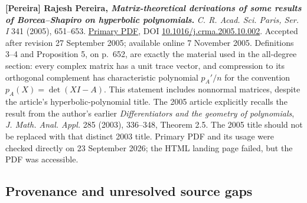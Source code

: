 \documentclass[
  british,
  10pt,
]{article}
\begin{document}
\textbf{{[}Pereira{]} Rajesh Pereira, \emph{Matrix-theoretical
derivations of some results of Borcea--Shapiro on hyperbolic
polynomials}.} \emph{C. R. Acad. Sci. Paris, Ser. I} 341 (2005),
651--653.
\href{https://www.numdam.org/item/CRMATH_2005__341_11_651_0.pdf}{Primary
PDF}, DOI
\href{https://doi.org/10.1016/j.crma.2005.10.002}{10.1016/j.crma.2005.10.002}.
Accepted after revision 27 September 2005; available online 7 November
2005. Definitions 3--4 and Proposition 5, on p.~652, are exactly the
material used in the all-degree section: every complex matrix has a unit
trace vector, and compression to its orthogonal complement has
characteristic polynomial \(p_A'/n\) for the convention
\(p_A(X)=\det(XI-A)\). This statement includes nonnormal matrices,
despite the article's hyperbolic-polynomial title. The 2005 article
explicitly recalls the result from the author's earlier
\emph{Differentiators and the geometry of polynomials}, \emph{J. Math.
Anal. Appl.} 285 (2003), 336--348, Theorem 2.5. The 2005 title should
not be replaced with that distinct 2003 title. Primary PDF and its usage
were checked directly on 23 September 2026; the HTML landing page
failed, but the PDF was accessible.

\subsection{Provenance and unresolved source
gaps}\label{provenance-and-unresolved-source-gaps}
\end{document}
